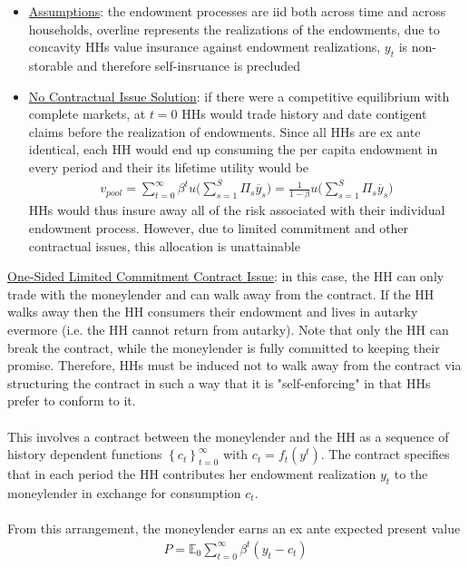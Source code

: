\documentclass{article}
\begin{document}
\begin{itemize}
    \item \underline{Assumptions}: the endowment processes are iid both across time and across households, overline represents the realizations of the endowments, due to concavity HHs value insurance against endowment realizations, $y_{t}$ is non-storable and therefore self-insruance is precluded
    \item \underline{No Contractual Issue Solution}: if there were a competitive equilibrium with complete markets, at $t=0$ HHs would trade history and date contigent claims before the realization of endowments. Since all HHs are ex ante identical, each HH would end up consuming the per capita endowment in every period and their its lifetime utility would be
    \begin{gather*}
        v_{pool} = \sum_{t=0}^{\infty} \beta^{t} u \Big( \sum_{s=1}^{S} \Pi_{s} \overline{y}_{s} \Big) = \frac{1}{1-\beta} u \Big( \sum_{s=1}^{S} \Pi_{s}\overline{y}_{s} \Big)
    \end{gather*}
    HHs would thus insure away all of the risk associated with their individual endowment process. However, due to limited commitment and other contractual issues, this allocation is unattainable
\end{itemize}
\vspace{2.5mm}
\par \underline{One-Sided Limited Commitment Contract Issue}: in this case, the HH can only trade with the moneylender and can walk away from the contract. If the HH walks away then the HH consumers their endowment and lives in autarky evermore (i.e. the HH cannot return from autarky). Note that only the HH can break the contract, while the moneylender is fully committed to keeping their promise. Therefore, HHs must be induced not to walk away from the contract via structuring the contract in such a way that it is "self-enforcing" in that HHs prefer to conform to it. \\ \\
This involves a contract between the moneylender and the HH as a sequence of history dependent functions $\left\{c_{t}\right\}_{t=0}^{\infty}$ with $c_{t} = f_{t} (y^{t})$. The contract specifies that in each period the HH contributes her endowment realization $y_{t}$ to the moneylender in exchange for consumption $c_{t}$. \\ \\
From this arrangement, the moneylender earns an ex ante expected present value
\begin{gather*}
    P = \mathbb{E}_{0} \sum_{t=0}^{\infty} \beta^{t} (y_{t} - c_{t})
\end{gather*}
\end{document}
